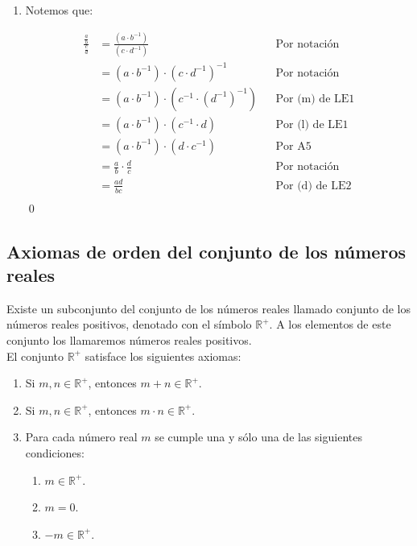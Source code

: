 \documentclass[11pt]{article}
\begin{document}
\begin{enumerate}[label=\alph*),font=\bfseries]
\pagebreak

\item Notemos que:

\begin{align*}
    \frac{\frac{a}{b}}{\frac{c}{d}} &= \frac{\left( a \cdot b^{-1} \right)}{\left( c \cdot d^{-1} \right)} && \text{Por notación}\\
    &= \left( a \cdot b^{-1} \right) \cdot \left( c \cdot d^{-1} \right)^{-1} && \text{Por notación}\\
    &= \left( a \cdot b^{-1} \right) \cdot \left( c^{-1} \cdot \left( d^{-1} \right) ^{-1} \right) && \text{Por (m) de LE1}\\
    &= \left( a \cdot b^{-1} \right) \cdot \left( c^{-1} \cdot d \right) && \text{Por (l) de LE1}\\
    &= \left( a \cdot b^{-1} \right) \cdot \left( d \cdot c^{-1} \right) && \text{Por A5}\\
    &= \frac{a}{b} \cdot \frac{d}{c} && \text{Por notación}\\
    &= \frac{ad}{bc} && \text{Por (d) de LE2}\\
\end{align*}
\qed

\end{enumerate}

\subsection*{Axiomas de orden del conjunto de los números reales}

Existe un subconjunto del conjunto de los números reales llamado conjunto de los números reales positivos, denotado con el símbolo $\mathbb{R}^+$. A los elementos de este conjunto los llamaremos números reales positivos.\\
El conjunto $\mathbb{R}^+$ satisface los siguientes axiomas:

\begin{enumerate}[label=O\arabic*), font=\bfseries]
    \item Si $m, n \in \mathbb{R}^+$, entonces $m + n \in \mathbb{R}^+$.
    \item Si $m, n \in \mathbb{R}^+$, entonces $m \cdot n \in \mathbb{R}^+$.
    \item Para cada número real $m$ se cumple una y sólo una de las siguientes condiciones: \label{tricotomía}
	\begin{enumerate}[label=\roman*), font=\bfseries]
    \item $m \in \mathbb{R}^+$.
    \item $m = 0$.
    \item $-m \in \mathbb{R}^+$.\
    \end{enumerate}
\end{enumerate}
\end{document}
